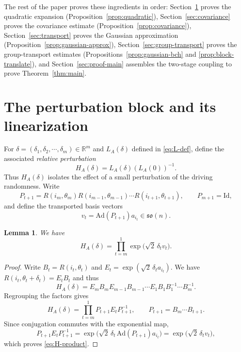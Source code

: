 \documentclass[11pt, reqno]{amsart}
\numberwithin{equation}{section}
\newtheorem{lemma}{Lemma}
\theoremstyle{remark}
\newcommand{\R}{\mathbb{R}}
\newcommand{\1}{\mathbf{1}}
\newcommand{\so}{\mathfrak{so}}
\newcommand{\Id}{\mathrm{Id}}
\newcommand{\Ad}{\mathrm{Ad}}
\begin{document}
The rest of the paper proves these ingredients in order:
Section~\ref{sec:perturbation} proves the quadratic expansion
(Proposition~\ref{prop:quadratic}),
Section~\ref{sec:covariance} proves the covariance estimate
(Proposition~\ref{prop:covariance}),
Section~\ref{sec:transport} proves the Gaussian approximation
(Proposition~\ref{prop:gaussian-approx}),
Section~\ref{sec:group-transport} proves the group-transport estimates
(Propositions~\ref{prop:gaussian-bch} and \ref{prop:block-translate}),
and Section~\ref{sec:proof-main} assembles the two-stage coupling to prove
Theorem~\ref{thm:main}.

\section{The perturbation block and its linearization}
\label{sec:perturbation}
For $\delta = (\delta_1, \delta_2, \cdots, \delta_m) \in\R^m$ and $L_A(\delta)$ defined in \eqref{eq:L-def},
define the associated \emph{relative perturbation}
\begin{equation}
\label{eq:H-def}
H_A(\delta)=L_A(\delta)(L_A(0))^{-1}.
\end{equation}
Thus $H_A(\delta)$ isolates the effect of a small perturbation of the driving randomness.
Write
\begin{equation}
\label{eq:Gt-Pt}
P_{t+1}=R(i_m,\theta_m)R(i_{m-1},\theta_{m-1})\cdots R(i_{t+1},\theta_{t+1}),
\qquad
P_{m+1}=\Id,
\end{equation}
and define the transported basis vectors
\begin{equation}
\label{eq:vt-def}
v_t=\Ad(P_{t+1})a_{i_t}\in \so(n).
\end{equation}


\begin{lemma}
We have
\begin{equation}
\label{eq:H-product}
H_A(\delta)=\prod_{t=m}^1 \exp\!\bigl(\sqrt{2}\,\delta_t v_t\bigr).
\end{equation}
\end{lemma}
\begin{proof}
Write \(B_t=R(i_t,\theta_t)\) and
\(E_t=\exp(\sqrt2\,\delta_t a_{i_t})\). We have
\(R(i_t,\theta_t+\delta_t)=E_tB_t\) and thus
\[
H_A(\delta)
=
E_mB_mE_{m-1}B_{m-1}\cdots E_1B_1
B_1^{-1}\cdots B_m^{-1}.
\]
Regrouping the factors gives
\[
H_A(\delta)
=
\prod_{t=m}^{1}
P_{t+1}E_tP_{t+1}^{-1},
\qquad
P_{t+1}=B_m\cdots B_{t+1}.
\]
Since conjugation commutes with the exponential map,
\[
P_{t+1}E_tP_{t+1}^{-1}
=
\exp\!\bigl(\sqrt2\,\delta_t\,\Ad(P_{t+1})a_{i_t}\bigr)
=
\exp\!\bigl(\sqrt2\,\delta_t v_t\bigr),
\]
which proves \eqref{eq:H-product}.
\end{proof}
\end{document}
